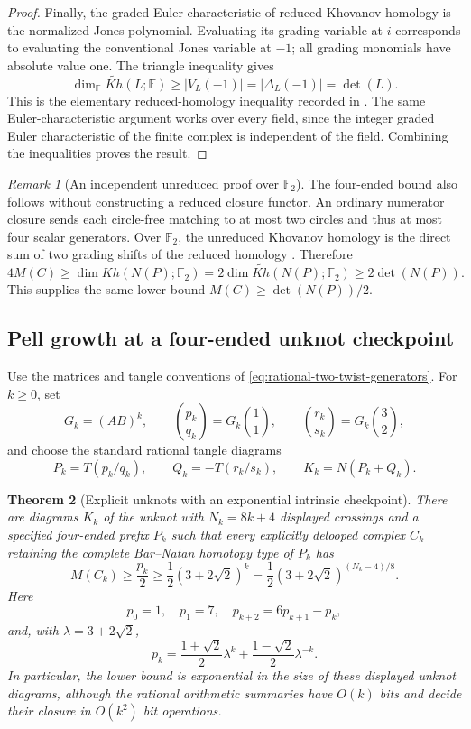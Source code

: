 \documentclass[11pt,a4paper]{article}
\newtheorem{theorem}{Theorem}[section]
\theoremstyle{definition}
\theoremstyle{remark}
\newtheorem{remark}[theorem]{Remark}
\numberwithin{equation}{section}
\begin{document}
\begin{proof}
Finally, the graded Euler characteristic of reduced Khovanov homology
is the normalized Jones polynomial.  Evaluating its grading variable
at $i$ corresponds to evaluating the conventional Jones variable at
$-1$; all grading monomials have absolute value one.  The triangle
inequality gives
\[
 \dim_{\mathbb F}\widetilde{Kh}(L;\mathbb F)
 \ge |V_L(-1)|=|\Delta_L(-1)|=\det(L).
\]
This is the elementary reduced-homology inequality recorded in
\cite[Section~3]{KhovanovPatterns}.  The same Euler-characteristic
argument works over every field, since the integer graded Euler
characteristic of the finite complex is independent of the field.
Combining the inequalities proves the result.
\end{proof}

\begin{remark}[An independent unreduced proof over $\mathbb F_2$]
The four-ended bound also follows without constructing a reduced
closure functor.  An ordinary numerator closure sends each
circle-free matching to at most two circles and thus at most four
scalar generators.  Over $\mathbb F_2$, the unreduced Khovanov
homology is the direct sum of two grading shifts of the reduced
homology \cite[Corollary~3.2.C]{ShumakovitchTorsion}.  Therefore
\[
 4M(C)\ge\dim Kh(N(P);\mathbb F_2)
 =2\dim\widetilde{Kh}(N(P);\mathbb F_2)
 \ge2\det(N(P)).
\]
This supplies the same lower bound $M(C)\ge\det(N(P))/2$.
\end{remark}

\subsection{Pell growth at a four-ended unknot checkpoint}

Use the matrices and tangle conventions of
\eqref{eq:rational-two-twist-generators}.  For $k\ge0$, set
\[
 G_k=(AB)^k,
 \qquad \binom{p_k}{q_k}=G_k\binom11,
 \qquad \binom{r_k}{s_k}=G_k\binom32,
\]
and choose the standard rational tangle diagrams
\[
 P_k=T(p_k/q_k),\qquad Q_k=-T(r_k/s_k),
 \qquad K_k=N(P_k+Q_k).
\]

\begin{theorem}[Explicit unknots with an exponential intrinsic checkpoint]
\label{thm:unknot-exponential-checkpoint}
There are diagrams $K_k$ of the unknot with $N_k=8k+4$ displayed
crossings and a specified four-ended prefix $P_k$ such that every
explicitly delooped complex $C_k$ retaining the complete Bar--Natan
homotopy type of $P_k$ has
\[
 M(C_k)\ge\frac{p_k}{2}
 \ge\frac12(3+2\sqrt2)^k
 =\frac12(3+2\sqrt2)^{(N_k-4)/8}.
\]
Here
\[
 p_0=1,\quad p_1=7,\quad
 p_{k+2}=6p_{k+1}-p_k,
\]
and, with $\lambda=3+2\sqrt2$,
\[
 p_k=\frac{1+\sqrt2}{2}\lambda^k
       +\frac{1-\sqrt2}{2}\lambda^{-k}.
\]
In particular, the lower bound is exponential in the size of these
displayed unknot diagrams, although the rational arithmetic summaries
have $O(k)$ bits and decide their closure in $O(k^2)$ bit operations.
\end{theorem}
\end{document}
